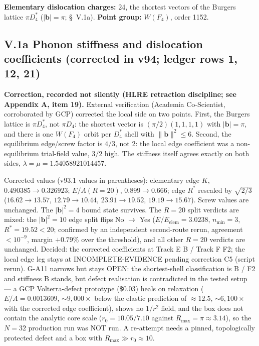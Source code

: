 \documentclass[a4paper,11pt]{article}
\begin{document}
\textbf{Elementary dislocation charges:} 24, the shortest vectors of the Burgers lattice $\pi D_4^*$ ($|\mathbf{b}|=\pi$; \S~V.1a). \textbf{Point group:} $W(F_4)$, order 1152.

\subsection*{V.1a Phonon stiffness and dislocation coefficients (corrected in v94; ledger rows 1, 12, 21)}

\textbf{Correction, recorded not silently (HLRE retraction discipline; see Appendix A, item 19).} External verification (Academia Co-Scientist, corroborated by GCP) corrected the local side on two points. First, the Burgers lattice is $\pi D_4^*$, not $\pi D_4$: the shortest vector is $(\pi/2)(1,1,1,1)$ with $|\mathbf{b}|=\pi$, and there is one $W(F_4)$ orbit per $D_4^*$ shell with $\lVert\mathbf{b}\rVert^2\le6$. Second, the equilibrium edge/screw factor is $4/3$, not $2$: the local edge coefficient was a non-equilibrium trial-field value, $3/2$ high. The stiffness itself agrees exactly on both sides, $\lambda=\mu=1.54058921014457$.

Corrected values (v93.1 values in parentheses): elementary edge $K$, $0.490385\to0.326923$; $E/A(R=20)$, $0.899\to0.666$; edge $R^*$ rescaled by $\sqrt{2/3}$ ($16.62\to13.57$, $12.79\to10.44$, $23.91\to19.52$, $19.19\to15.67$). Screw values are unchanged. The $|\mathbf{b}|^2=4$ bound state survives. The $R=20$ split verdicts are mixed: the $|\mathbf{b}|^2=10$ edge split flips No $\to$ Yes ($E/E_{\mathrm{elem}}=3.0238$, $n_{\min}=3$, $R^*=19.52<20$; confirmed by an independent second-route rerun, agreement $<10^{-9}$, margin $+0.79\%$ over the threshold), and all other $R=20$ verdicts are unchanged. Decided: the corrected coefficients at Track E B / Track F F2; the local edge leg stays at INCOMPLETE-EVIDENCE pending correction C5 (script rerun). G-A11 narrows but stays OPEN: the shortest-shell classification is B / F2 and stiffness B stands, but defect realisation is contradicted in the tested setup --- a GCP Volterra-defect prototype ($\$0.03$) heals on relaxation ($E/A=0.0013609$, $\sim9{,}000\times$ below the elastic prediction of $\approx12.5$, $\sim6{,}100\times$ with the corrected edge coefficient), shows no $1/r^2$ field, and the box does not contain the analytic core scale ($r_0=10.05/7.10$ against $R_{\max}=\pi\approx3.14$), so the $N=32$ production run was NOT run. A re-attempt needs a pinned, topologically protected defect and a box with $R_{\max}\gg r_0\approx10$.
\end{document}
